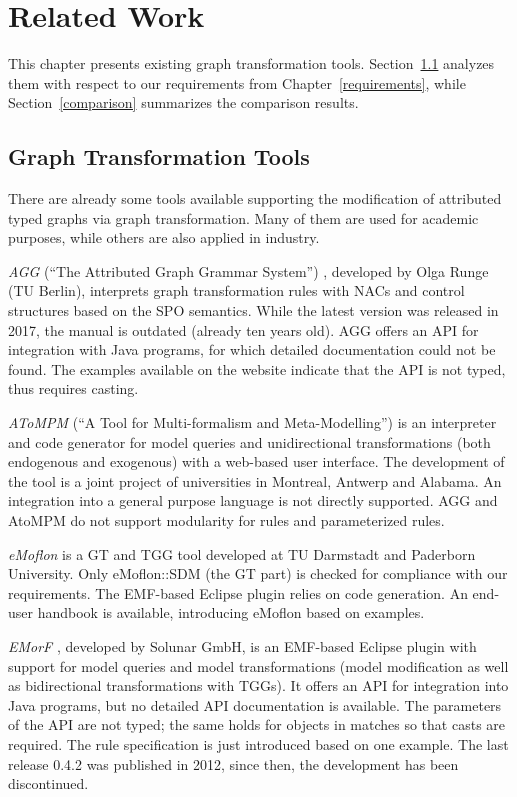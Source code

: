 
\chapter{Related Work}
\label{related-work}
This chapter presents existing graph transformation tools.
Section~\ref{tools} analyzes them with respect to our requirements from Chapter~\ref{requirements}, while Section~\ref{comparison} summarizes the comparison results.

\section{Graph Transformation Tools}
\label{tools}

There are already some tools available supporting the modification of attributed typed graphs via graph transformation.
Many of them are used for academic purposes, while others are also applied in industry.

\textit{AGG} (``The Attributed Graph Grammar System'') \cite{AGGWebsite}, developed by Olga Runge (TU Berlin), interprets graph transformation rules with NACs and control structures based on the SPO semantics.
While the latest version was released in 2017, the manual \cite{AGGManual} is outdated (already ten years old).
AGG offers an API for integration with Java programs, for which detailed documentation could not be found.
The examples available on the website indicate that the API is not typed, thus requires casting.

\textit{AToMPM} (``A Tool for Multi-formalism and Meta-Modelling'') \cite{AToMPMDocs} is an interpreter and code generator for model queries and unidirectional transformations (both endogenous and exogenous) with a web-based user interface.
The development of the tool is a joint project of universities in Montreal, Antwerp and Alabama.
An integration into a general purpose language is not directly supported.
AGG and AtoMPM do not support modularity for rules and parameterized rules.

\textit{eMoflon} \cite{eMoflonWebsite} is a GT and TGG tool developed at TU Darmstadt and Paderborn University.
Only eMoflon::SDM (the GT part) is checked for compliance with our requirements.
The EMF-based Eclipse plugin relies on code generation.
An end-user handbook \cite{eMoflonHandbook} is available, introducing eMoflon based on examples.

\textit{EMorF} \cite{EMorFWebsite}, developed by Solunar GmbH, is an EMF-based Eclipse plugin with support for model queries and model transformations (model modification as well as bidirectional transformations with TGGs).
It offers an API for integration into Java programs, but no detailed API documentation is available.
The parameters of the API are not typed; the same holds for objects in matches so that casts are required.
The rule specification is just introduced based on one example.
The last release 0.4.2 was published in 2012, since then, the development has been discontinued.

